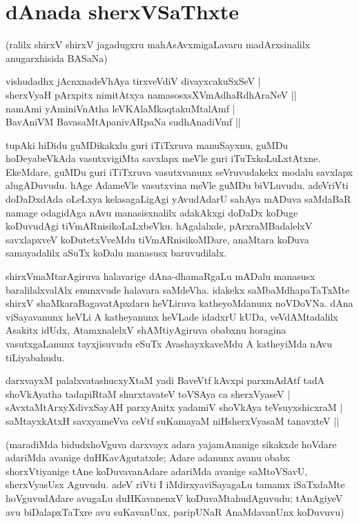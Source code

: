 \chapter{dAnada sherxVSaThxte}\label{chap14}

({}ralilx shirxV shirxV jagadugxru mahAsAvxmigaLavaru madArxsinalilx anugarxhisida BASaNa)

\begin{shloka}
vishudadhx jAcnxnadeVhAya tirxveVdiV divayxcakuSxSeV |\\
sherxVyaH pArxpitx nimitAtxya namasosxsXVmAdhaRdhAraNeV ||\\
namAmi yAminiVnAtha leVKAlaMkaqtakuMtalAmf |\\
BavAniVM BavasaMtApanivARpaNa sudhAnadiVmf ||
\end{shloka}

tupAki hiDidu guMDikakxlu guri iTiTxruva manuSayxnu, guMDu hoDeyabeVkAda vasutxvigiMta savxlapx meVle guri iTuTxkoLuLxtAtxne. EkeMdare, guMDu guri iTiTxruva vasutxvanunx seVruvudakekx modalu savxlapx alugADuvudu. hAge AdameVle vasutxvina meVle guMDu biVLuvudu. adeVriVti doDaDxdAda oLeLxya kelasagaLigAgi yAvudAdarU sahAya mADuva saMdaBaR namage odagidAga nAvu manasisxnalilx adakAkxgi doDaDx koDuge koDuvudAgi tiVmARnisikoLaLxbeVku. hAgalalxde, pArxraMBadalelxV savxlapxveV koDutetxVveMdu tiVmARnisikoMDare, anaMtara koDuva samayadalilx aSuTx koDalu manasusx baruvudilalx.

shirxVmaMtarAgiruva halavarige dAna-dhamaRgaLu mADalu manasusx baralilalxvalAlx enunxvude halavara saMdeVha. idakekx saMbaMdhapaTaTxMte shirxV shaMkaraBagavatApxdaru heVLiruva katheyoMdanunx noVDoVNa. dAna viSayavanunx heVLi A katheyanunx heVLade idadxrU kUDa, veVdAMtadalilx Asakitx idUdx, AtamxnalelxV shAMtiyAgiruva obabxnu horagina vasutxgaLanunx tayxjisuvudu eSuTx AvashayxkaveMdu A katheyiMda nAvu tiLiyabahudu.

\begin{shloka}
darxvayxM palalxvatashucxyXtaM yadi BaveVtf kAvxpi parxmAdAtf tadA\\
shoVkAyatha tadapiRtaM shurxtavateV toVSAya ca sherxVyaseV |\\
sAvxtaMtArxyXdivxSayAH parxyAnitx yadamiV shoVkAya teVsuyxshicxraM |\\
saMtayxkAtxH savxyameVva ceVtf suKamayaM niHsherxVyasaM tanavxteV ||
\end{shloka}

(maradiMda bidudxhoVguva darxvayx adara yajamAnanige sikakxde hoVdare adariMda avanige duHKavAgutatxde; Adare adanunx avanu obabx shorxVtiyanige tAne koDuvavanAdare adariMda avanige saMtoVSavU, sherxVyasUsx Aguvudu. adeV riVti I iMdirxyaviSayagaLu tamamx iSaTxdaMte hoVguvudAdare avugaLu duHKavanenxV koDuvaMtahudAguvudu; tAnAgiyeV avu biDalapxTaTxre avu suKavanUnx, paripUNaR AnaMdavanUnx koDuvuvu)

